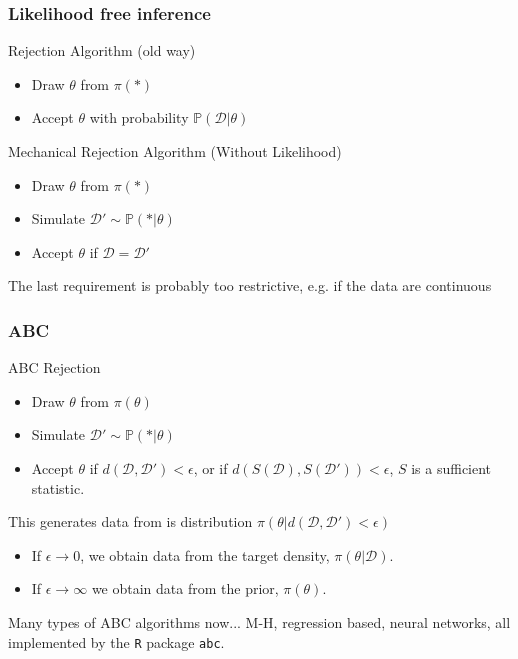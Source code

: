 \documentclass{beamer}
\begin{document}
\begin{frame}
  \frametitle{Likelihood free inference}

\begin{block}{Rejection Algorithm (old way)}
  \begin{itemize}
  \item Draw $\theta$ from $\pi(*)$
  
  \item Accept $\theta$ with probability $\mathbb{P} (\mathcal{D} |\theta)$
  \end{itemize}
\pause
\end{block}
\pause
\begin{block}{Mechanical Rejection Algorithm (Without Likelihood)}

  \begin{itemize}
  \item Draw $\theta$ from $\pi(*)$
    
  \item Simulate $\mathcal{D}' \sim \mathbb{P} ( * | \theta)$

  \item Accept $\theta$ if $\mathcal{D} = \mathcal{D}'$
  \end{itemize}
\end{block}

The last requirement is probably too restrictive, e.g. if the data are continuous
 
\end{frame}

\begin{frame}
  \frametitle{ABC}

  \begin{block}{ABC Rejection}
    \begin{itemize}
  \item Draw $\theta$ from $\pi(\theta)$

    
  \item Simulate $\mathcal{D}' \sim \mathbb{P} (* | \theta)$

  \item Accept $\theta$ if $d ( \mathcal{D} , \mathcal{D}' ) < \epsilon$, or if
    $d ( S( \mathcal{D} ), S(\mathcal{D}') ) < \epsilon$, $S$ is a sufficient statistic. 
  \end{itemize}
\end{block}
\pause

This generates data from is distribution $ \pi (\theta | d ( \mathcal{D} , \mathcal{D}' ) < \epsilon) $

\begin{itemize}
\item  If $\epsilon \to 0$, we obtain data from the target density, $\pi(\theta | \mathcal{D})$.
\item If $\epsilon \to \infty$ we obtain data from the prior, $\pi(\theta)$.

\end{itemize}

\pause

Many types of ABC algorithms now... M-H, regression based, neural networks, all implemented by the \texttt{R} package \texttt{abc}.

\end{frame}
\end{document}
